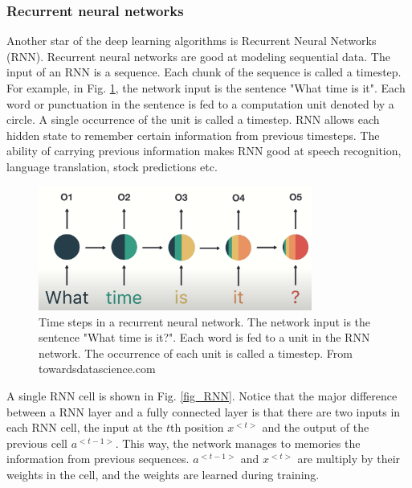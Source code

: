 \subsubsection{Recurrent neural networks}
Another star of the deep learning algorithms is Recurrent Neural Networks (RNN). Recurrent neural networks are good at modeling sequential data. The input of an RNN is a sequence. Each chunk of the sequence is called a timestep. For example, in Fig. \ref{fig_RNN_timestep}, the network input is the sentence "What time is it". Each word or punctuation in the sentence is fed to a computation unit denoted by a circle. A single occurrence of the unit is called a timestep. RNN allows each hidden state to remember certain information from previous timesteps. The ability of carrying previous information makes RNN good at speech recognition, language translation, stock predictions etc. 
\begin{figure}[h!]
\begin{center}
\includegraphics[width = 9cm]{img/RNN.png}
\caption[Time steps in a recurrent neural network]{Time steps in a recurrent neural network. The network input is the sentence "What time is it?". Each word is fed to a unit in the RNN network. The occurrence of each unit is called a timestep. From towardsdatascience.com \label{fig_RNN_timestep}}
\end{center}
\end{figure}

 A single RNN cell is shown in Fig. \ref{fig_RNN}. Notice that the major difference between a RNN layer and a fully connected layer is that there are two inputs in each RNN cell, the input at the $t$th position $x^{<t>}$ and the output of the previous cell $a^{<t-1>}$. This way, the network manages to memories the information from previous sequences. $a^{<t-1>}$ and $x^{<t>}$ are multiply by their weights in the cell, and the weights are learned during training. 


